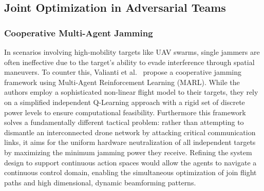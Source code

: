 \documentclass[conference]{IEEEtran}
\newcommand{\adm}[1]{{\color{orange}{[#1]}}}
\begin{document}
\subsection{Joint Optimization in Adversarial Teams}

\subsubsection{Cooperative Multi-Agent Jamming}
In scenarios involving high-mobility targets like UAV swarms, single jammers are often ineffective due to the target's ability to evade interference through spatial maneuvers. 
To counter this, Valianti et al.~ propose a cooperative jamming framework using Multi-Agent Reinforcement Learning (MARL). 
While the authors employ a sophisticated non-linear flight model to their targets, they rely on a simplified independent Q-Learning approach with a rigid set of discrete power levels to ensure computational feasibility.
Furthermore this framework solves a fundamentally different tactical problem: rather than attempting to dismantle an interconnected drone network by attacking critical communication links, it aims for the uniform hardware neutralization of all independent targets by maximizing the minimum jamming power they receive.
Refining the system design to support continuous action spaces would allow the agents to navigate a continuous control domain, enabling the simultaneous optimization of join flight paths and high dimensional, dynamic beamforming patterns.
\end{document}
